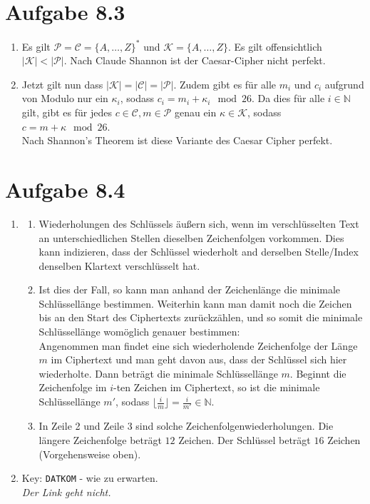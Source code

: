 \documentclass[12pt, a4paper]{article}
\begin{document}
\section*{Aufgabe 8.3}
\begin{enumerate}[label=\alph*)]
	\item	Es gilt $\mathcal{P} = \mathcal{C} = \{A, \dots, Z\}^*$ und $\mathcal{K} = \{A, \dots, Z\}$.  Es gilt offensichtlich $\vert \mathcal{K} \vert < \vert \mathcal{P} \vert$. Nach Claude Shannon ist der Caesar-Cipher nicht perfekt.
	\item	Jetzt gilt nun dass $\vert \mathcal{K} \vert = \vert \mathcal{C} \vert = \vert \mathcal{P} \vert$. Zudem gibt es für alle $m_i$ und $c_i$ aufgrund von Modulo nur ein $\kappa_i$, sodass $c_i = m_i + \kappa_i \mod 26$. Da dies für alle $i \in \mathbb{N}$ gilt, gibt es für jedes $c \in \mathcal{C}, m \in \mathcal{P}$ genau ein $\kappa \in \mathcal{K}$, sodass $c = m + \kappa \mod 26$.\\
			Nach Shannon's Theorem ist diese Variante des Caesar Cipher perfekt.
\end{enumerate}


\newpage


\section*{Aufgabe 8.4}
\begin{enumerate}[label=\alph*)]
	\item	\begin{enumerate}[label=\roman*.]
				\item	Wiederholungen des Schlüssels äußern sich, wenn im verschlüsselten Text an unterschiedlichen Stellen dieselben Zeichenfolgen vorkommen. Dies kann indizieren, dass der Schlüssel wiederholt and derselben Stelle/Index denselben Klartext verschlüsselt hat.
				\item	Ist dies der Fall, so kann man anhand der Zeichenlänge die minimale Schlüssellänge bestimmen. Weiterhin kann man damit noch die Zeichen bis an den Start des Ciphertexts zurückzählen, und so somit die minimale Schlüssellänge womöglich genauer bestimmen:\\
						Angenommen man findet eine sich wiederholende Zeichenfolge der Länge $m$ im Ciphertext und man geht davon aus, dass der Schlüssel sich hier wiederholte. Dann beträgt die minimale Schlüssellänge $m$. Beginnt die Zeichenfolge im $i$-ten Zeichen im Ciphertext, so ist die minimale Schlüssellänge $m'$, sodass $\lfloor \frac{i}{m} \rfloor = \frac{i}{m'} \in \mathbb{N}$.
				\item	In Zeile 2 und Zeile 3 sind solche Zeichenfolgenwiederholungen. Die längere Zeichenfolge beträgt $12$ Zeichen. Der Schlüssel beträgt $16$ Zeichen (Vorgehensweise oben).
			\end{enumerate}
	\item	Key: \verb|DATKOM| - wie zu erwarten.\\
			\textit{Der Link geht nicht.}
\end{enumerate}
\end{document}
